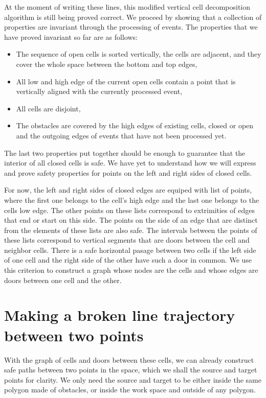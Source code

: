 \documentclass{easychair}
\begin{document}
At the moment of writing these lines, this modified vertical cell
decomposition algorithm is still being proved correct.  We proceed by
showing that a collection of properties are invariant through the
processing of events.  The properties that we have proved invariant so
far are as follows:
\begin{itemize}
\item The sequence of open cells is sorted vertically, the cells are
  adjacent, and they cover the whole space between the bottom and top
  edges,
\item All low and high edge of the current open cells contain a point
that is vertically aligned with the currently processed event,
\item All cells are disjoint,
\item The obstacles are covered by the high edges of existing cells,
  closed or open and the outgoing edges of events that have not been
  processed yet.
\end{itemize}
The last two properties put together should be enough to guarantee
that the interior of all closed cells is safe.  We have yet to
understand how we will express and prove safety properties for points
on the left and right sides of closed cells.

For now, the left and right sides of closed edges are equiped with
list of points, where the first one belongs to the cell's high edge
and the last one belongs to the cells low edge.  The other points on
these lists correspond to extrimities of edges that end or start on
this side.  The points on the side of an edge that are distinct from
the elements of these lists are also safe.  The intervals between the
points of these lists correspond to vertical segments that are doors
between the cell and neighbor cells.  There is a safe horizontal
pasage between two cells if the left side of one cell and the right
side of the other have such a door in common.  We use this criterion
to construct a graph whose nodes are the cells and whose edges are
doors between one cell and the other.

\section{Making a broken line trajectory between two points}
With the graph of cells and doors between these cells, we can already
construct safe paths between two points in the space, which we shall
the source and target points for clarity.  We only need the source and
target to be either inside the same polygon made of obstacles, or
inside the work space and outside of any polygon.
\end{document}
